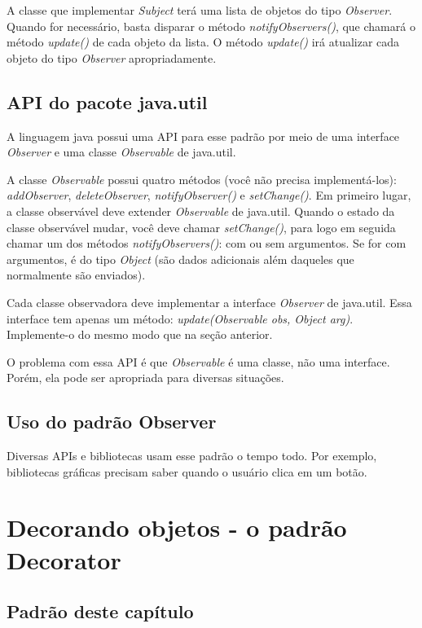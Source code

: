 \documentclass[a4paper,11pt]{report}
\begin{document}
A classe que implementar \textit{Subject} terá uma lista de objetos do tipo \textit{Observer}. Quando for necessário, basta disparar o método \textit{notifyObservers()}, que chamará o método \textit{update()} de cada objeto da lista. O método \textit{update()} irá atualizar cada objeto do tipo \textit{Observer} apropriadamente.

\section{API do pacote java.util}

A linguagem java possui uma API para esse padrão por meio de uma interface \textit{Observer} e uma classe \textit{Observable} de java.util.

A classe \textit{Observable} possui quatro métodos (você não precisa implementá-los): \textit{addObserver}, \textit{deleteObserver}, \textit{notifyObserver()} e \textit{setChange()}. Em primeiro lugar, a classe observável deve extender \textit{Observable} de java.util. Quando o estado da classe observável mudar, você deve chamar \textit{setChange()}, para logo em seguida chamar um dos métodos \textit{notifyObservers()}: com ou sem argumentos. Se for com argumentos, é do tipo \textit{Object} (são dados adicionais além daqueles que normalmente são enviados).

Cada classe observadora deve implementar a interface \textit{Observer} de java.util. Essa interface tem apenas um método: \textit{update(Observable obs, Object arg)}. Implemente-o do mesmo modo que na seção anterior.

O problema com essa API é que \textit{Observable} é uma classe, não uma interface. Porém, ela pode ser apropriada para diversas situações.

\section{Uso do padrão Observer}

Diversas APIs e bibliotecas usam esse padrão o tempo todo. Por exemplo, bibliotecas gráficas precisam saber quando o usuário clica em um botão.

\chapter{Decorando objetos - o padrão Decorator}
\label{chap:decorator}

\section{Padrão deste capítulo}
\end{document}
